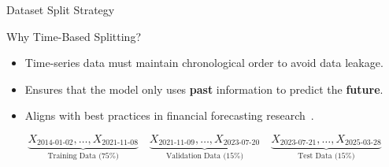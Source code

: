 \begin{frame}[label=datasetsplit, shrink]{Dataset Split Strategy}

\small

\begin{block}{Why Time-Based Splitting?}
\begin{itemize}
    \item Time-series data must maintain chronological order to avoid data leakage.
    \item Ensures that the model only uses \textbf{past} information to predict the \textbf{future}.
    \item Aligns with best practices in financial forecasting research~\parencite{chang2024StockPrediction, guo2024LSTMStock}.
\end{itemize}
\end{block}

\vspace{0.5em}
{\footnotesize
\begin{equation}
\label{eq:dataset_split_dates}
\underbrace{X_{\text{2014-01-02}}, \dots, X_{\text{2021-11-08}}}_{\text{Training Data (75\%)}} 
\quad
\underbrace{X_{\text{2021-11-09}}, \dots, X_{\text{2023-07-20}}}_{\text{Validation Data (15\%)}} 
\quad
\underbrace{X_{\text{2023-07-21}}, \dots, X_{\text{2025-03-28}}}_{\text{Test Data (15\%)}} 
\end{equation}
}
\end{frame}

